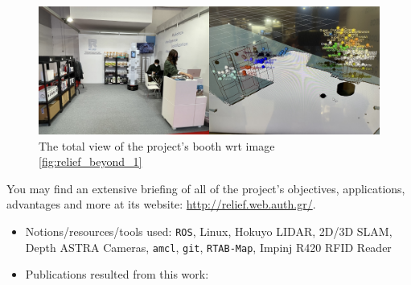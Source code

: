 
\begin{figure}[H]\centering
  \includegraphics[scale=0.5]{images/relief_2.png}
  \caption{\small The total view of the project's booth wrt image
           \ref{fig:relief_beyond_1}}
  \label{fig:relief_beyond_2}
\end{figure}


You may find an extensive briefing of all of the project's objectives,
applications, advantages and more at its website:
\url{http://relief.web.auth.gr/}.



\begin{itemize}
  \item Notions/resources/tools used: \texttt{ROS}, Linux, Hokuyo LIDAR, 2D/3D SLAM, Depth ASTRA Cameras, \texttt{amcl}, \texttt{git}, \texttt{RTAB-Map}, Impinj R420 RFID Reader
\item Publications resulted from this work: \cite{8739423,8739486,Filotheou2020a,9109328,9244904,Filotheou2020b,9566425,9617436}
\end{itemize}
